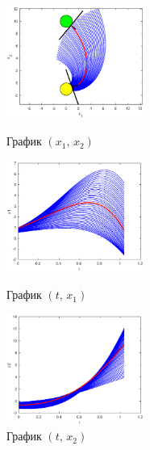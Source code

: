 \documentclass[11pt]{article}
\begin{document}
\newpage
\begin{figure}[h]
\begin{multicols}{3}
	\hfill
	\includegraphics[width=45mm]{2xx.eps}
	\hfill
	\caption{График $(x_1, \, x_2)$}
	\hfill
	\includegraphics[width=45mm]{2tx1.eps}
	\hfill
	\caption{График $(t, \, x_1)$}
    \hfill
	\includegraphics[width=45mm]{2tx2.eps}
	\hfill
	\caption{График $(t, \, x_2)$}
\end{multicols}
\end{figure}		
\end{document}
